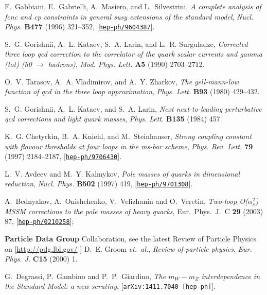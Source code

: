 \documentclass{article}
\begin{document}
\begin{thebibliography}{10}
F.~Gabbiani, E.~Gabrielli, A.~Masiero, and L.~Silvestrini, {\it A complete
  analysis of fcnc and cp constraints in general susy extensions of the
  standard model},  {\em Nucl. Phys.} {\bf B477} (1996) 321--352,
  [\href{http://xxx.lanl.gov/abs/hep-ph/9604387}{{\tt hep-ph/9604387}}].

S.~G. Gorishnii, A.~L. Kataev, S.~A. Larin, and L.~R. Surguladze, {\it
  Corrected three loop qcd correction to the correlator of the quark scalar
  currents and gamma (tot) (h0 $\to$ hadrons)},  {\em Mod. Phys. Lett.} {\bf
  A5} (1990) 2703--2712.

O.~V. Tarasov, A.~A. Vladimirov, and A.~Y. Zharkov, {\it The gell-mann-low
  function of qcd in the three loop approximation},  {\em Phys. Lett.} {\bf
  B93} (1980) 429--432.

S.~G. Gorishnii, A.~L. Kataev, and S.~A. Larin, {\it Next next-to-leading
  perturbative qcd corrections and light quark masses},  {\em Phys. Lett.} {\bf
  B135} (1984) 457.

K.~G. Chetyrkin, B.~A. Kniehl, and M.~Steinhauser, {\it Strong coupling
  constant with flavour thresholds at four loops in the ms-bar scheme},  {\em
  Phys. Rev. Lett.} {\bf 79} (1997) 2184--2187,
  [\href{http://xxx.lanl.gov/abs/hep-ph/9706430}{{\tt hep-ph/9706430}}].

L.~V. Avdeev and M.~Y. Kalmykov, {\it Pole masses of quarks in dimensional
  reduction}, {\em Nucl. Phys. } {\bf B502} (1997) 419,
  [\href{http://xxx.lanl.gov/abs/hep-ph/9701308}{{\tt hep-ph/9701308}}].

A.~Bednyakov, A.~Onishchenko, V.~Velizhanin and O.~Veretin,
{\it Two-loop O($\alpha_s^2$) MSSM corrections to the pole masses of heavy
  quarks}, Eur.\ Phys.\ J.\ C {\bf 29} (2003) 87,
  [\href{http://xxx.lanl.gov/abs/hep-ph/0210258}{{\tt hep-ph/0210258}}];

{\bf Particle Data Group} Collaboration, 
see the latest Review of Particle Physics on 
  [\href{http://pdg.lbl.gov/}{http://pdg.lbl.gov/}
]
D.~E. Groom {\em et.~al.}, {\it Review
  of particle physics},  {\em Eur. Phys. J.} {\bf C15} (2000) 1.

G.~Degrassi, P.~Gambino and P.~P.~Giardino, {\em The $m_W-m_Z$ interdependence
in the Standard Model: a new scrutiny}, 
  [{{\tt arXiv:1411.7040 [hep-ph]}}].


\end{thebibliography}
\end{document}
